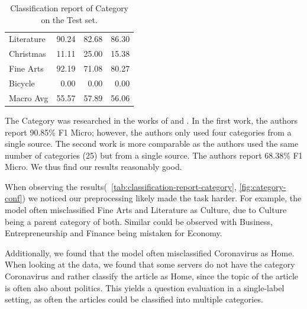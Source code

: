 \begin{table}[h]
\begin{tabular}{lrrr}
        Literature             & 90.24     & 82.68  & 86.30 \\
        Christmas              & 11.11     & 25.00  & 15.38 \\
        Fine Arts              & 92.19     & 71.08  & 80.27 \\
        Bicycle                & 0.00      & 0.00   & 0.00  \\
        Macro Avg              & 55.57     & 57.89  & 56.06 \\
        \bottomrule
    \end{tabular}
    \caption{Classification report of Category on the Test set.}
    \label{tab:classification-report-category}
\end{table}
The Category was researched in the works of \cite{sunagar2021news} and \cite{fuksClassificationNewsDataset2018}.
In the first work, the authors report 90.85\% F1 Micro; however, the authors only used four categories from a single source.
The second work is more comparable as the authors used the same number of categories (25) but from a single source.
The authors report 68.38\% F1 Micro. We thus find our results reasonably good.

When observing the results(~\autoref{tab:classification-report-category}, \autoref{fig:category-conf})
we noticed our preprocessing likely made the task harder. For example,
the model often misclassified Fine Arts and Literature as Culture, due to Culture being a parent category of both.
Similar could be observed with Business, Entrepreneurship and Finance being mistaken for Economy.

Additionally, we found that the model often misclassified Coronavirus as Home.
When looking at the data,
we found that some servers do not have the category Coronavirus and rather classify the article as Home,
since the topic of the article is often also about politics. This yields a question
evaluation in a single-label setting, as often the articles could be classified into multiple categories.

